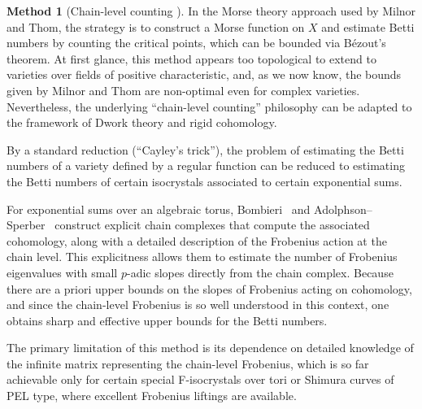 \documentclass[english]{smfart}
\theoremstyle{remark}
\theoremstyle{plain}
\theoremstyle{definition}
\numberwithin{equation}{remark}
\theoremstyle{void}
\newtheorem{method}[remark]{Method}
\begin{document}
\begin{method}[Chain-level counting \cite{bombieri_exponential-sums-1,bombieri_exponential-sums-2,adolphson-sperber_degree-l-function}]
\label{method:chain-level}
In the Morse theory approach used by Milnor and Thom, the strategy is
to construct a Morse function on \(X\) and estimate Betti numbers by
counting the critical points, which can be bounded via Bézout's
theorem.  At first glance, this method appears too topological to
extend to varieties over fields of positive characteristic, and, as we
now know, the bounds given by Milnor and Thom are non-optimal even for
complex varieties.  Nevertheless, the underlying ``chain-level
counting'' philosophy can be adapted to the framework of Dwork theory
and rigid cohomology.

By a standard reduction (``Cayley's trick''), the problem of
estimating the Betti numbers of a variety defined by a regular
function can be reduced to estimating the Betti numbers of certain isocrystals associated to
certain exponential sums.

For exponential sums over an algebraic torus,
Bombieri~\cite{bombieri_exponential-sums-2} and
Adolphson--Sperber~\cite{adolphson-sperber_degree-l-function}
construct explicit chain complexes that compute the associated
cohomology, along with a detailed description of the Frobenius
action at the chain level.  This explicitness allows them to estimate
the number of Frobenius eigenvalues with small \(p\)-adic slopes
directly from the chain complex.  Because there are a priori upper bounds
on the slopes of Frobenius acting on cohomology, and since the
chain-level Frobenius is so well understood in this context, one obtains
sharp and effective upper bounds for the Betti numbers.

The primary limitation of this method is its dependence on detailed knowledge
of the infinite matrix representing the chain-level Frobenius, which is so
far achievable only for certain special F-isocrystals over tori or Shimura
curves of PEL type, where excellent Frobenius liftings are available.
\end{method}
\end{document}
